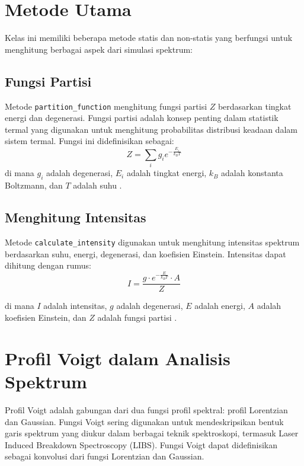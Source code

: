 \section{Metode Utama}
\par Kelas ini memiliki beberapa metode statis dan non-statis yang berfungsi untuk menghitung berbagai aspek dari simulasi spektrum:

\subsection{Fungsi Partisi}
\par Metode \texttt{partition\_function} menghitung fungsi partisi $Z$ berdasarkan tingkat energi dan degenerasi. Fungsi partisi adalah konsep penting dalam statistik termal yang digunakan untuk menghitung probabilitas distribusi keadaan dalam sistem termal. Fungsi ini didefinisikan sebagai:
\begin{equation}
    Z = \sum_{i} g_i e^{-\frac{E_i}{k_B T}}
\end{equation}
di mana $g_i$ adalah degenerasi, $E_i$ adalah tingkat energi, $k_B$ adalah konstanta Boltzmann, dan $T$ adalah suhu \parencite{pathria2011}.

\subsection{Menghitung Intensitas}
\par Metode \texttt{calculate\_intensity} digunakan untuk menghitung intensitas spektrum berdasarkan suhu, energi, degenerasi, dan koefisien Einstein. Intensitas dapat dihitung dengan rumus:
\begin{equation}
I = \frac{g \cdot e^{-\frac{E}{k_B T}} \cdot A}{Z}
\end{equation}

di mana $I$ adalah intensitas, $g$ adalah degenerasi, $E$ adalah energi, $A$ adalah koefisien Einstein, dan $Z$ adalah fungsi partisi \parencite{mason2015}.


\section{Profil Voigt dalam Analisis Spektrum}
\par Profil Voigt adalah gabungan dari dua fungsi profil spektral: profil Lorentzian dan Gaussian. Fungsi Voigt sering digunakan untuk mendeskripsikan bentuk garis spektrum yang diukur dalam berbagai teknik spektroskopi, termasuk Laser Induced Breakdown Spectroscopy (LIBS). Fungsi Voigt dapat didefinisikan sebagai konvolusi dari fungsi Lorentzian dan Gaussian.

